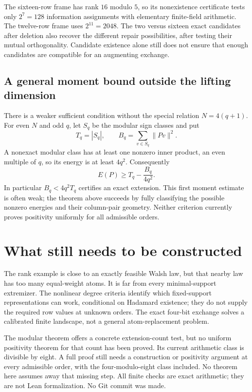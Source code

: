 \documentclass[11pt]{article}
\begin{document}
The sixteen-row frame has rank $16$ modulo $5$, so its nonexistence
certificate tests only $2^7=128$ information assignments with elementary
finite-field arithmetic. The twelve-row frame uses $2^{11}=2048$.
The two versus sixteen exact candidates after deletion also recover
the different repair possibilities, after testing their mutual
orthogonality. Candidate existence alone still does not ensure that
enough candidates are compatible for an augmenting exchange.

\subsection{A general moment bound outside the lifting dimension}
There is a weaker sufficient condition without the special relation
$N=4(q+1)$. For even $N$ and odd $q$, let $S_q$ be the modular sign
classes and put
\[
 T_q=|S_q|,\qquad B_q=\sum_{v\in S_q}\|Pv\|^2.
\]
A nonexact modular class has at least one nonzero inner product, an
even multiple of $q$, so its energy is at least $4q^2$. Consequently
\[
 E(P)\ge T_q-\frac{B_q}{4q^2}.
\]
In particular $B_q<4q^2T_q$ certifies an exact extension. This first
moment estimate is often weak; the theorem above succeeds by fully
classifying the possible nonzero energies and their column-pair
geometry. Neither criterion currently proves positivity uniformly
for all admissible orders.

\section{What still needs to be constructed}
The rank example is close to an exactly feasible Walsh law, but that
nearby law has too many equal-weight atoms. It is far from every
minimal-support extremizer. The nonlinear degree criteria identify
which fixed-support representations can work, conditional on
Hadamard existence; they do not supply the required row values at
unknown orders. The exact four-bit exchange solves a calibrated
finite landscape, not a general atom-replacement problem.

The modular theorem offers a concrete extension-count test, but no
uniform positivity theorem for that count has been proved. Its current
arithmetic class is divisible by eight. A full proof still needs a
construction or positivity argument at every admissible order, with
the four-modulo-eight class included. No theorem here assumes away
that missing step. All finite checks are exact arithmetic; they are
not Lean formalization. No Git commit was made.
\end{document}
